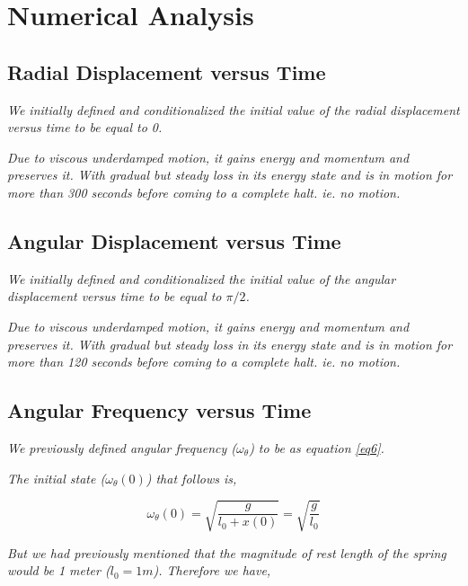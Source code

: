 \section{{Numerical Analysis}}
        
    \subsection{{Radial Displacement versus Time}}
            
                \textit{We initially defined and conditionalized the initial value of the radial displacement versus time to be equal to 0.}
                
                \textit{Due to viscous underdamped motion, it gains energy and momentum and preserves it. With gradual but steady loss in its energy state and is in motion for more than 300 seconds before coming to a complete halt. ie. no motion.}
    
    \subsection{{Angular Displacement versus Time}}
            
                \textit{We initially defined and conditionalized the initial value of the angular displacement versus time to be equal to $\pi/2$.}
                
                \textit{Due to viscous underdamped motion, it gains energy and momentum and preserves it. With gradual but steady loss in its energy state and is in motion for more than 120 seconds before coming to a complete halt. ie. no motion.}
    
                
    \subsection{{Angular Frequency versus Time}}
                
                \textit{We previously defined angular frequency ($\omega_\theta$) to be as equation \ref{eq6}.}
                
                \textit{The initial state ($\omega_\theta(0)$) that follows is,}
                
                $$\omega_\theta(0) = \sqrt{\frac{g}{l_0 + x(0)}} = \sqrt{\frac{g}{l_0}}$$
                
                \textit{But we had previously mentioned that the magnitude of rest length of the spring would be 1 meter ($l_0 = 1 m$). Therefore we have,}
                
